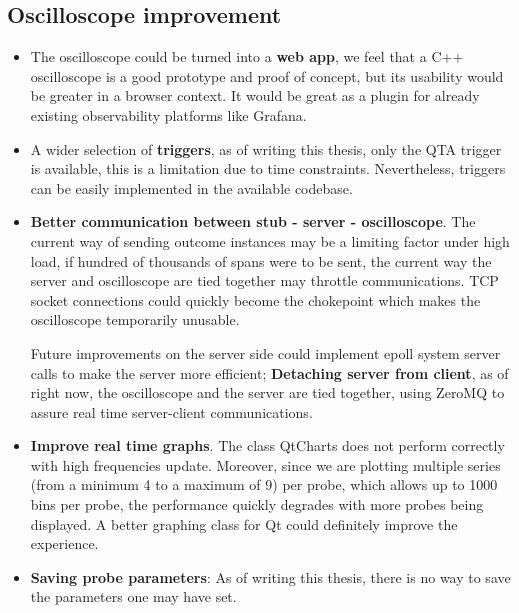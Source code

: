         \subsection{Oscilloscope improvement}
           \begin{itemize}
            
                \item The oscilloscope could be turned into a \textbf{web app}, we feel that a C++ oscilloscope is a good prototype and proof of concept, but its usability would be greater in a browser context. It would be great as a plugin for already existing observability platforms like Grafana.
            
                \item A wider selection of \textbf{triggers}, as of writing this thesis, only the QTA trigger is available, this is a limitation due to time constraints. Nevertheless, triggers can be easily implemented in the available codebase.
            
                \item \textbf{Better communication between stub - server - oscilloscope}. The current way of sending outcome instances may be a limiting factor under high load, if hundred of thousands of spans were to be sent, the current way the server and oscilloscope are tied together may throttle communications. TCP socket connections could quickly become the chokepoint which makes the oscilloscope temporarily unusable.

            Future improvements on the server side could implement epoll system server calls to make the server more efficient; \textbf{Detaching server from client}, as of right now, the oscilloscope and the server are tied together, using ZeroMQ to assure real time server-client communications.

                \item \textbf{Improve real time graphs}. The class QtCharts does not perform correctly with high frequencies update. Moreover, since we are plotting multiple series (from a minimum 4 to a maximum of 9) per probe, which allows up to 1000 bins per probe, the performance quickly degrades with more probes being displayed. A better graphing class for Qt could definitely improve the experience.
                \item \textbf{Saving probe parameters}: As of writing this thesis, there is no way to save the parameters one may have set. 
           \end{itemize} 
            
